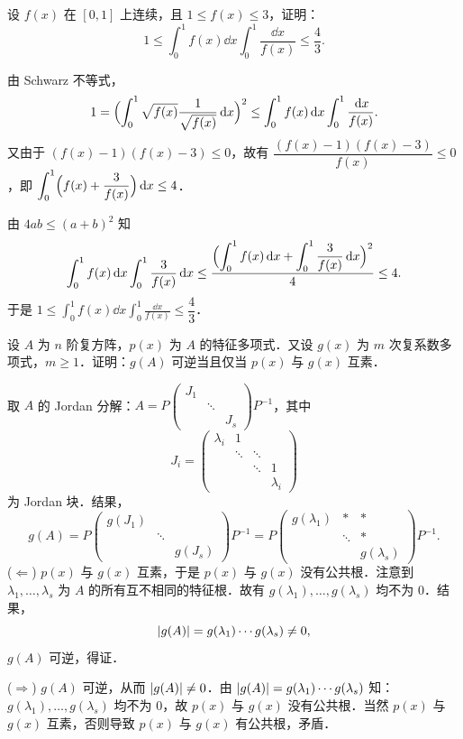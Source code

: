 设 $f(x)$ 在 $[0,1]$ 上连续，且 $1\le f(x)\le 3$，证明：
\[
  1\le\int_{0}^{1}f(x)\dd x\int_{0}^{1}\frac{\dd x}{f(x)}\le\frac{4}{3}.
\]
\begin{solution}
由 Schwarz 不等式，
\[
  1=\Bigl(\int_{0}^{1}\sqrt{f(x)}\frac{1}{\sqrt{f(x)}}\,\mathrm{d} x\Bigr)^{2}
  \le\int_{0}^{1}f(x)\,\mathrm{d} x\int_{0}^{1}\frac{\,\mathrm{d} x}{f(x)}.
\]
又由于 $(f(x)-1)(f(x)-3)\le 0$，故有 $\dfrac{(f(x)-1)(f(x)-3)}{f(x)}\le 0$，即 $\displaystyle\int_{0}^{1}\Bigl(f(x)+\frac{3}{f(x)}\Bigr)\,\mathrm{d} x\le 4$．

由 $4ab\le(a+b)^{2}$ 知
\[
  \int_{0}^{1}f(x)\,\mathrm{d} x\int_{0}^{1}\frac{3}{f(x)}\,\mathrm{d} x
  \le\frac{\Bigl(\displaystyle\int_{0}^{1}f(x)\,\mathrm{d} x+\int_{0}^{1}\frac{3}{f(x)}\,\mathrm{d} x\Bigr)^{2}}{4}\le 4.
\]
于是 $1\le\displaystyle\int_{0}^{1}f(x)\dd x\int_{0}^{1}\frac{\dd x}{f(x)}\le\dfrac{4}{3}$．
\end{solution}

设 $A$ 为 $n$ 阶复方阵，$p(x)$ 为 $A$ 的特征多项式．又设 $g(x)$ 为 $m$ 次复系数多项式，$m\ge 1$．证明：$g(A)$ 可逆当且仅当 $p(x)$ 与 $g(x)$ 互素．
\begin{solution}
取 $A$ 的 Jordan 分解：$A=P\begin{pmatrix}J_{1}&&\\&\ddots&\\&&J_{s}\end{pmatrix}P^{-1}$，其中
\[
  J_{i}=\begin{pmatrix}
    \lambda_{i} & 1 & & \\
    & \ddots & \ddots & \\
    & & \ddots & 1\\
    & & & \lambda_{i}
  \end{pmatrix}
\]
为 Jordan 块．结果，
\begin{equation}
  g(A)=P\begin{pmatrix}g(J_{1})&&\\&\ddots&\\&&g(J_{s})\end{pmatrix}P^{-1}
  =P\begin{pmatrix}g(\lambda_{1})&*&*\\&\ddots&*\\&&g(\lambda_{s})\end{pmatrix}P^{-1}. \tag{$*$}
\end{equation}
($\Leftarrow$) $p(x)$ 与 $g(x)$ 互素，于是 $p(x)$ 与 $g(x)$ 没有公共根．注意到 $\lambda_{1},\dots,\lambda_{s}$ 为 $A$ 的所有互不相同的特征根．故有 $g(\lambda_{1}),\dots,g(\lambda_{s})$ 均不为 $0$．结果，
\[
  \left|g(A)\right|=g(\lambda_{1})\cdots g(\lambda_{s})\ne 0,
\]
$g(A)$ 可逆，得证．

($\Rightarrow$) $g(A)$ 可逆，从而 $\left|g(A)\right|\ne 0$．由 $\left|g(A)\right|=g(\lambda_{1})\cdots g(\lambda_{s})$ 知：$g(\lambda_{1}),\dots,g(\lambda_{s})$ 均不为 $0$，故 $p(x)$ 与 $g(x)$ 没有公共根．当然 $p(x)$ 与 $g(x)$ 互素，否则导致 $p(x)$ 与 $g(x)$ 有公共根，矛盾．
\end{solution}

